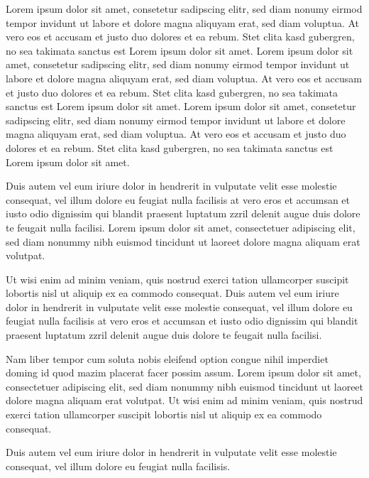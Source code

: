 Lorem ipsum dolor sit amet, consetetur sadipscing elitr, sed diam nonumy eirmod tempor invidunt ut labore et dolore magna aliquyam erat, sed diam voluptua. At vero eos et accusam et justo duo dolores et ea rebum. Stet clita kasd gubergren, no sea takimata sanctus est Lorem ipsum dolor sit amet. Lorem ipsum dolor sit amet, consetetur sadipscing elitr, sed diam nonumy eirmod tempor invidunt ut labore et dolore magna aliquyam erat, sed diam voluptua. At vero eos et accusam et justo duo dolores et ea rebum. Stet clita kasd gubergren, no sea takimata sanctus est Lorem ipsum dolor sit amet. Lorem ipsum dolor sit amet, consetetur sadipscing elitr, sed diam nonumy eirmod tempor invidunt ut labore et dolore magna aliquyam erat, sed diam voluptua. At vero eos et accusam et justo duo dolores et ea rebum. Stet clita kasd gubergren, no sea takimata sanctus est Lorem ipsum dolor sit amet. 

Duis autem vel eum iriure dolor in hendrerit in vulputate velit esse molestie consequat, vel illum dolore eu feugiat nulla facilisis at vero eros et accumsan et iusto odio dignissim qui blandit praesent luptatum zzril delenit augue duis dolore te feugait nulla facilisi. Lorem ipsum dolor sit amet, consectetuer adipiscing elit, sed diam nonummy nibh euismod tincidunt ut laoreet dolore magna aliquam erat volutpat. 

Ut wisi enim ad minim veniam, quis nostrud exerci tation ullamcorper suscipit lobortis nisl ut aliquip ex ea commodo consequat. Duis autem vel eum iriure dolor in hendrerit in vulputate velit esse molestie consequat, vel illum dolore eu feugiat nulla facilisis at vero eros et accumsan et iusto odio dignissim qui blandit praesent luptatum zzril delenit augue duis dolore te feugait nulla facilisi. 

Nam liber tempor cum soluta nobis eleifend option congue nihil imperdiet doming id quod mazim placerat facer possim assum. Lorem ipsum dolor sit amet, consectetuer adipiscing elit, sed diam nonummy nibh euismod tincidunt ut laoreet dolore magna aliquam erat volutpat. Ut wisi enim ad minim veniam, quis nostrud exerci tation ullamcorper suscipit lobortis nisl ut aliquip ex ea commodo consequat. 

Duis autem vel eum iriure dolor in hendrerit in vulputate velit esse molestie consequat, vel illum dolore eu feugiat nulla facilisis. 